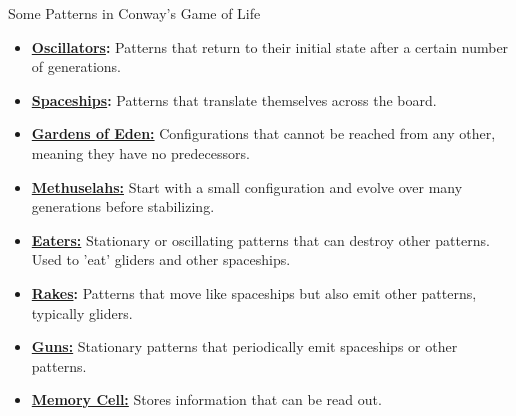\begin{frame}{Some Patterns in Conway's Game of Life}
\small
\begin{itemize} 
    \item \textbf{\href{https://playgameoflife.com/lexicon/stillater}{Oscillators}:} Patterns that return to their initial state after a certain number of generations. 
    \item \textbf{\href{https://playgameoflife.com/lexicon/56P6H1V0}{Spaceships}:} Patterns that translate themselves across the board. 
    \item \textbf{\href{https://playgameoflife.com/lexicon/Garden_of_Eden_(1)}{Gardens of Eden:}} Configurations that cannot be reached from any other, meaning they have no predecessors.
    \item \textbf{\href{https://playgameoflife.com/lexicon/acorn}{Methuselahs:}} Start with a small configuration and evolve over many generations before stabilizing.
    \item \textbf{\href{https://playgameoflife.com/lexicon/eater1_(2)}{Eaters:}} Stationary or oscillating patterns that can destroy other patterns. Used to 'eat' gliders and other spaceships.
    \item \textbf{\href{https://playgameoflife.com/lexicon/backrake}{Rakes}:} Patterns that move like spaceships but also emit other patterns, typically gliders.
    \item \textbf{\href{https://playgameoflife.com/lexicon/Gosper_glider_gun}{Guns:}} Stationary patterns that periodically emit spaceships or other patterns.
    \item \textbf{\href{https://playgameoflife.com/lexicon/memory_cell}{Memory Cell:}} Stores information that can be read out.
\end{itemize}
\end{frame}

